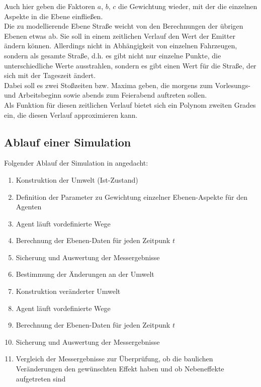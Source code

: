 \documentclass[10pt]{scrartcl}
\begin{document}
Auch hier geben die Faktoren $a$, $b$, $c$ die Gewichtung wieder, mit der die einzelnen Aspekte in die Ebene einfließen.\\
Die zu modellierende Ebene Straße weicht von den Berechnungen der übrigen Ebenen etwas ab. Sie soll in einem zeitlichen Verlauf den Wert der Emitter ändern können. Allerdings nicht in Abhängigkeit von einzelnen Fahrzeugen, sondern als gesamte Straße, d.h. es gibt nicht nur einzelne Punkte, die unterschiedliche Werte ausstrahlen, sondern es gibt einen Wert für die Straße, der sich mit der Tageszeit ändert.\\
Dabei soll es zwei Stoßzeiten bzw. Maxima geben, die morgens zum Vorlesungs- und Arbeitsbeginn sowie abends zum Feierabend auftreten sollen.\\
Als Funktion für diesen zeitlichen Verlauf bietet sich ein Polynom zweiten Grades ein, die diesen Verlauf approximieren kann.

\subsection{Ablauf einer Simulation}
Folgender Ablauf der Simulation in angedacht:

\begin{enumerate}
\item Konstruktion der Umwelt (Ist-Zustand)
\item Definition der Parameter zu Gewichtung einzelner Ebenen-Aspekte für den Agenten
\item Agent läuft vordefinierte Wege
\item Berechnung der Ebenen-Daten für jeden Zeitpunk $t$
\item Sicherung und Auswertung der Messergebnisse
\item Bestimmung der Änderungen an der Umwelt
\item Konstruktion veränderter Umwelt
\item Agent läuft vordefinierte Wege
\item Berechnung der Ebenen-Daten für jeden Zeitpunk $t$
\item Sicherung und Auswertung der Messergebnisse
\item Vergleich der Messergebnisse zur Überprüfung, ob die baulichen Veränderungen den gewünschten Effekt haben und ob Nebeneffekte aufgetreten sind
\end{enumerate}
\end{document}
